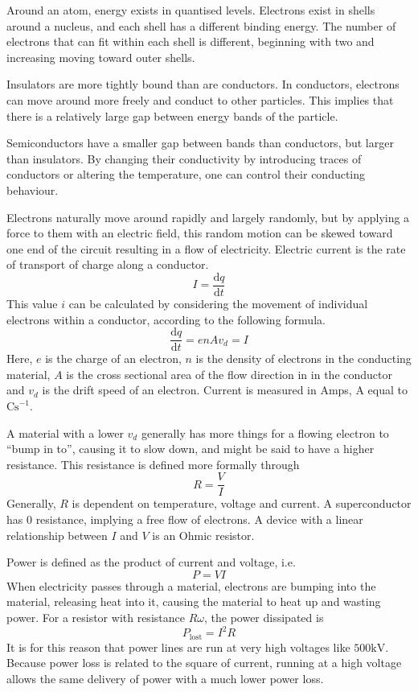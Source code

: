 \documentclass[12pt]{report}
\begin{document}
\begin{flushleft}
Around an atom, energy exists in quantised levels. Electrons exist in shells
around a nucleus, and each shell has a different binding energy. The number of
electrons that can fit within each shell is different, beginning with two and
increasing moving toward outer shells. \par
Insulators are more tightly bound than are conductors. In conductors, electrons
can move around more freely and conduct to other particles. This implies that 
there is a relatively large gap between energy bands of the particle. \par
Semiconductors have a smaller gap between bands than conductors, but larger 
than insulators. By changing their conductivity by introducing traces of
conductors or altering the temperature, one can control their conducting 
behaviour. \par
Electrons naturally move around rapidly and largely randomly, but by applying
a force to them with an electric field, this random motion can be skewed toward
one end of the circuit resulting in a flow of electricity. Electric current is
the rate of transport of charge along a conductor.
\[I = \frac{\mathrm{d}q}{\mathrm{d}t}\]
This value \(i\) can be calculated by considering the movement of individual
electrons within a conductor, according to the following formula.
\[\frac{\mathrm{d}q}{\mathrm{d}t} = enAv_d = I\]
Here, \(e\) is the charge of an electron, \(n\) is the density of electrons in
the conducting material, \(A\) is the cross sectional area of the flow
direction in in the conductor and \(v_d\) is the drift speed of an electron.
Current is measured in Amps, \(\mathrm{A}\) equal to \(\mathrm{Cs}^{-1}\).
\par
A material with a lower \(v_d\) generally has more things for a flowing 
electron to ``bump in to'', causing it to slow down, and might be said to have
a higher resistance. This resistance is defined more formally through
\[R = \frac{V}{I}\]
Generally, \(R\) is dependent on temperature, voltage and current. A 
superconductor has \(0\) resistance, implying a free flow of electrons. A
device with a linear relationship between \(I\) and \(V\) is an Ohmic resistor.
\par
Power is defined as the product of current and voltage, i.e.
\[P = VI\]
When electricity passes through a material, electrons are bumping into the 
material, releasing heat into it, causing the material to heat up and wasting
power. For a resistor with resistance \(R\omega\), the power dissipated is
\[P_\mathrm{lost} = I^2R\]
It is for this reason that power lines are run at very high voltages like 
\(500\mathrm{kV}\). Because power loss is related to the square of current,
running at a high voltage allows the same delivery of power with a much lower
power loss.


\end{flushleft}
\end{document}
